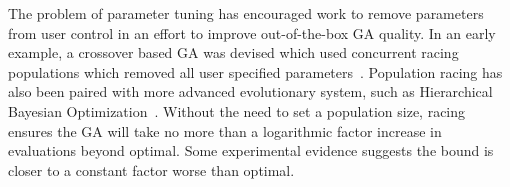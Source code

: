 \documentclass{sig-alternate}
\begin{document}
\begin{comment}
Often built into the design of a genetic algorithm (GA) are
evolutionary parameters which allow the user to tune the optimizer's
assumptions to match a specific problem.  These parameters can allow
a GA to more efficiently search the problem's landscape.  However, to
do so the user must first determine how to correctly \textbf{tune} the
parameters, typically a complex and time consuming process unto
itself.

Some considerable work has been devoted to understanding how to tune
these parameters. Early work in Evolutionary Strategies introduced the
concept of self-adaptive evolution which was subsequently introduced
to genetic algorithms~\cite{Back:1992:selfadapt}. Here, each solution
carries some of the parameters used and those parameters are adapted
along with the solution they are co-encoded with. Other work introduced the concept
of a \emph{meta} algorithm~\cite{grefenstette:1986:optimalga}. Here a
second optimizer runs ``on top'' of the actual problem-solving
optimizer, the second slowly tuning the parameters of the first. Both
of these approaches are rather slow, in particular the meta
approach, as actual problem solving must occur at set levels to give
feedback as to how to change the parameters (online or to the meta
optimizer). 

Many parameters have ``reasonable'' settings that are
unlikely to effect the order of complexity of a genetic algorithm,
with population size being a notable exception. For example, an overly small
population can cause exponential search times, while arbitrarily large
population sizes can lead to wasted evaluations and stalled search.
More importantly, setting the population size correctly relies on
difficult to discern features of each problem. 
Goldberg~\cite{goldberg:1991:gasize} showed that small
population sizes were not capable of finding good solutions, though
some practitioners~\cite{haupt:2000:optimum} have found that small
populations with a large mutation rate are effective on some practical
problems.
\end{comment}

The problem of parameter tuning has encouraged work to remove parameters from
user control in an effort to improve out-of-the-box GA quality. In
an early example, a crossover based GA was devised which used
concurrent racing populations which removed all user specified
parameters~\cite{harik:1999:parameterlessga}.
Population racing has also been paired with more advanced evolutionary
system, such as Hierarchical Bayesian
Optimization~\cite{pelikan:2004:parameterlesshboa}.
Without the need to set a population size, racing ensures the GA will take no more than
a logarithmic factor increase in evaluations beyond optimal.
Some experimental evidence suggests the bound is closer to a constant
factor worse than optimal.
\end{document}

